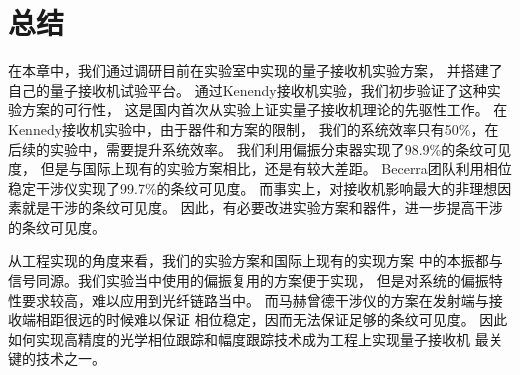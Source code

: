 \section{总结}
在本章中，我们通过调研目前在实验室中实现的量子接收机实验方案，
并搭建了自己的量子接收机试验平台。
通过Kenendy接收机实验，我们初步验证了这种实验方案的可行性，
这是国内首次从实验上证实量子接收机理论的先驱性工作。
在Kennedy接收机实验中，由于器件和方案的限制，
我们的系统效率只有50\%，在后续的实验中，需要提升系统效率。
我们利用偏振分束器实现了98.9\%的条纹可见度，
但是与国际上现有的实验方案相比，还是有较大差距。
Becerra团队利用相位稳定干涉仪实现了99.7\%的条纹可见度\cite{becerra2013experimental}。
而事实上，对接收机影响最大的非理想因素就是干涉的条纹可见度\cite{li2013suppressing}。
因此，有必要改进实验方案和器件，进一步提高干涉的条纹可见度。

从工程实现的角度来看，我们的实验方案和国际上现有的实现方案
中的本振都与信号同源\cite{wittmann2008demonstration,wittmann2010demonstration,tsujino2010sub,
tsujino2011quantum,becerra2011m,chen2012optical,muller2012quadrature,becerra2013experimental,
becerra2015photon}。我们实验当中使用的偏振复用的方案便于实现，
但是对系统的偏振特性要求较高，难以应用到光纤链路当中。
而马赫曾德干涉仪的方案在发射端与接收端相距很远的时候难以保证
相位稳定，因而无法保证足够的条纹可见度。
因此如何实现高精度的光学相位跟踪和幅度跟踪技术成为工程上实现量子接收机
最关键的技术之一。




